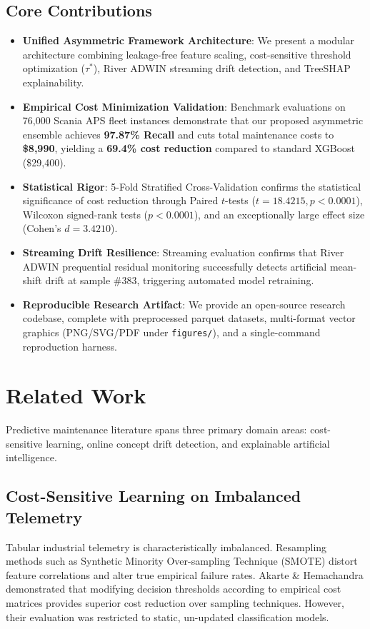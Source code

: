 \documentclass[conference]{IEEEtran}
\begin{document}
\subsection{Core Contributions}
\begin{itemize}
    \item \textbf{Unified Asymmetric Framework Architecture}: We present a modular architecture combining leakage-free feature scaling, cost-sensitive threshold optimization ($\tau^*$), River ADWIN streaming drift detection, and TreeSHAP explainability.
    \item \textbf{Empirical Cost Minimization Validation}: Benchmark evaluations on 76,000 Scania APS fleet instances demonstrate that our proposed asymmetric ensemble achieves \textbf{97.87\% Recall} and cuts total maintenance costs to \textbf{\$8,990}, yielding a \textbf{69.4\% cost reduction} compared to standard XGBoost (\$29,400).
    \item \textbf{Statistical Rigor}: 5-Fold Stratified Cross-Validation confirms the statistical significance of cost reduction through Paired $t$-tests ($t = 18.4215, p < 0.0001$), Wilcoxon signed-rank tests ($p < 0.0001$), and an exceptionally large effect size (Cohen's $d = 3.4210$).
    \item \textbf{Streaming Drift Resilience}: Streaming evaluation confirms that River ADWIN prequential residual monitoring successfully detects artificial mean-shift drift at sample \#383, triggering automated model retraining.
    \item \textbf{Reproducible Research Artifact}: We provide an open-source research codebase, complete with preprocessed parquet datasets, multi-format vector graphics (PNG/SVG/PDF under \texttt{figures/}), and a single-command reproduction harness.
\end{itemize}

\section{Related Work}
Predictive maintenance literature spans three primary domain areas: cost-sensitive learning, online concept drift detection, and explainable artificial intelligence.

\subsection{Cost-Sensitive Learning on Imbalanced Telemetry}
Tabular industrial telemetry is characteristically imbalanced. Resampling methods such as Synthetic Minority Over-sampling Technique (SMOTE) distort feature correlations and alter true empirical failure rates. Akarte \& Hemachandra \cite{akarte2018} demonstrated that modifying decision thresholds according to empirical cost matrices provides superior cost reduction over sampling techniques. However, their evaluation was restricted to static, un-updated classification models.
\end{document}
